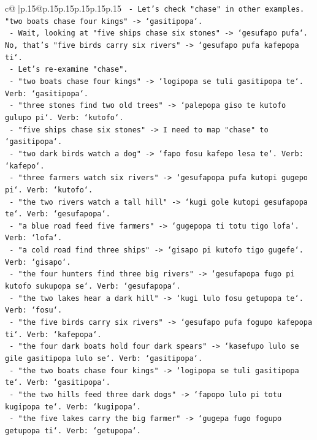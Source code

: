 \documentclass{article}
\begin{document}
{\begin{supertabular}{c@{$\;$}|p{.15\linewidth}@{}p{.15\linewidth}p{.15\linewidth}p{.15\linewidth}p{.15\linewidth}p{.15\linewidth}}
{{{\texttt{    {-} Let's check "chase" in other examples. "two boats chase four kings" {-}> `gasitipopa`.} \\
\texttt{    {-} Wait, looking at "five ships chase six stones" {-}> `gesufapo pufa`. No, that's "five birds carry six rivers" {-}> `gesufapo pufa kafepopa ti`.} \\
\texttt{    {-} Let's re{-}examine "chase".} \\
\texttt{    {-} "two boats chase four kings" {-}> `logipopa se tuli gasitipopa te`. Verb: `gasitipopa`.} \\
\texttt{    {-} "three stones find two old trees" {-}> `palepopa giso te kutofo gulupo pi`. Verb: `kutofo`.} \\
\texttt{    {-} "five ships chase six stones" {-}> I need to map "chase" to `gasitipopa`.} \\
\texttt{    {-} "two dark birds watch a dog" {-}> `fapo fosu kafepo lesa te`. Verb: `kafepo`.} \\
\texttt{    {-} "three farmers watch six rivers" {-}> `gesufapopa pufa kutopi gugepo pi`. Verb: `kutofo`.} \\
\texttt{    {-} "the two rivers watch a tall hill" {-}> `kugi gole kutopi gesufapopa te`. Verb: `gesufapopa`.} \\
\texttt{    {-} "a blue road feed five farmers" {-}> `gugepopa ti totu tigo lofa`. Verb: `lofa`.} \\
\texttt{    {-} "a cold road find three ships" {-}> `gisapo pi kutofo tigo gugefe`. Verb: `gisapo`.} \\
\texttt{    {-} "the four hunters find three big rivers" {-}> `gesufapopa fugo pi kutofo sukupopa se`. Verb: `gesufapopa`.} \\
\texttt{    {-} "the two lakes hear a dark hill" {-}> `kugi lulo fosu getupopa te`. Verb: `fosu`.} \\
\texttt{    {-} "the five birds carry six rivers" {-}> `gesufapo pufa fogupo kafepopa ti`. Verb: `kafepopa`.} \\
\texttt{    {-} "the four dark boats hold four dark spears" {-}> `kasefupo lulo se gile gasitipopa lulo se`. Verb: `gasitipopa`.} \\
\texttt{    {-} "the two boats chase four kings" {-}> `logipopa se tuli gasitipopa te`. Verb: `gasitipopa`.} \\
\texttt{    {-} "the two hills feed three dark dogs" {-}> `fapopo lulo pi totu kugipopa te`. Verb: `kugipopa`.} \\
\texttt{    {-} "the five lakes carry the big farmer" {-}> `gugepa fugo fogupo getupopa ti`. Verb: `getupopa`.} \\
}}}
\end{supertabular}}
\end{document}
